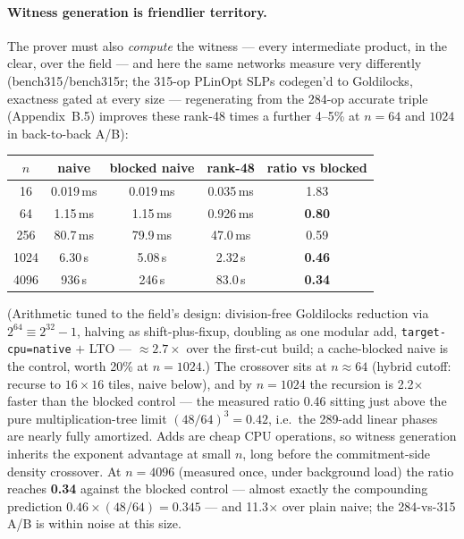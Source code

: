\documentclass[10pt]{article}
\begin{document}
\paragraph{Witness generation is friendlier territory.} The
prover must also \emph{compute} the witness --- every
intermediate product, in the clear, over the field --- and here
the same networks measure very differently (bench315/bench315r;
the 315-op PLinOpt SLPs codegen'd to Goldilocks, exactness gated
at every size --- regenerating from the 284-op accurate triple
(Appendix~B.5) improves these rank-48 times a further 4--5\% at
$n = 64$ and $1024$ in back-to-back A/B):
\begin{center}
\begin{tabular}{ccccc}
$n$ & naive & blocked naive & rank-48 & ratio vs blocked\\
\hline
16 & 0.019\,ms & 0.019\,ms & 0.035\,ms & 1.83\\
64 & 1.15\,ms & 1.15\,ms & 0.926\,ms & \textbf{0.80}\\
256 & 80.7\,ms & 79.9\,ms & 47.0\,ms & 0.59\\
1024 & 6.30\,s & 5.08\,s & 2.32\,s & \textbf{0.46}\\
4096 & 936\,s & 246\,s & 83.0\,s & \textbf{0.34}\\
\end{tabular}
\end{center}
(Arithmetic tuned to the field's design: division-free Goldilocks
reduction via $2^{64} \equiv 2^{32}{-}1$, halving as
shift-plus-fixup, doubling as one modular add,
\texttt{target-cpu=native} $+$ LTO --- ${\approx}2.7\times$ over
the first-cut build; a cache-blocked naive is the control, worth
20\% at $n = 1024$.) The crossover sits at $n \approx 64$
(hybrid cutoff: recurse to $16{\times}16$ tiles, naive below),
and by $n = 1024$ the recursion is 2.2$\times$ faster than the
blocked control --- the measured ratio 0.46 sitting just above the
pure multiplication-tree limit $(48/64)^3 = 0.42$, i.e.\ the
289-add linear phases are nearly fully amortized. Adds are cheap
CPU operations, so witness generation inherits the exponent
advantage at small $n$, long before the commitment-side density
crossover. At $n = 4096$ (measured once, under background load)
the ratio reaches \textbf{0.34} against the blocked control ---
almost exactly the compounding prediction
$0.46 \times (48/64) = 0.345$ --- and 11.3$\times$ over plain
naive; the 284-vs-315 A/B is within noise at this size.
\end{document}
